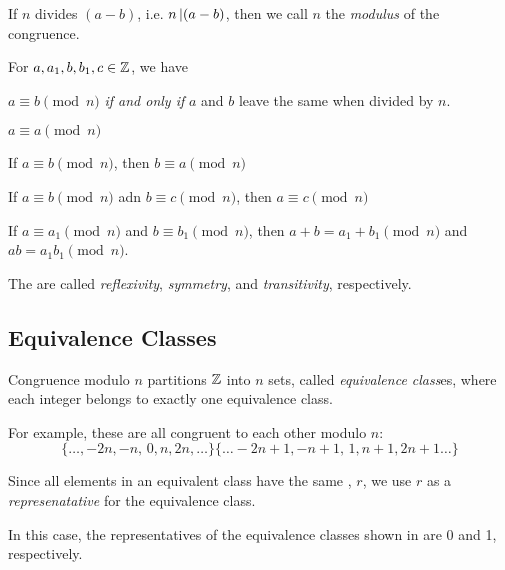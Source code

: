 If $n$ divides $(a-b)$, i.e. $n \operatorname{\vert} (a-b)$, then we call $n$ the \emph{modulus} of the congruence.

\begin{theorem}
  For $a, a_{1}, b, b_{1}, c\in \operatorname{\mathbb{Z}}$, we have
  \begin{propertylist}
  \item $a \equiv b \pmod{n}$ \emph{if and only if} $a$ and $b$ leave the same  when divided by $n$.
  \item $a \equiv a \pmod{n}$ \label{prop:A_Congruent_B_Reflexivity}
  \item If $a \equiv b \pmod{n}$, then $b \equiv a \pmod{n}$ \label{prop:A_Congruent_B_Symmetry}
  \item If $a \equiv b \pmod{n}$ adn $b \equiv c \pmod{n}$, then $a \equiv c \pmod{n}$ \label{prop:A_Congruent_B_Transitivity}
  \item If $a \equiv a_{1} \pmod{n}$ and $b \equiv b_{1} \pmod{n}$, then $a+b = a_{1} + b_{1} \pmod{n}$ and $ab = a_{1}b_{1} \pmod{n}$.
  \end{propertylist}

  The  are called \emph{reflexivity}, \emph{symmetry}, and \emph{transitivity}, respectively.
\end{theorem}

\subsection{Equivalence Classes}\label{subsec:Equivalence_Classes}
\begin{definition}\label{def:Equivalence Class}
  Congruence modulo $n$ partitions $\operatorname{\mathbb{Z}}$ into $n$ sets, called \emph{equivalence class}es, where each integer belongs to exactly one equivalence class.

  For example, these are all congruent to each other modulo $n$:
  \begin{subequations}\label{eq:Equivalence_Class}
    \begin{equation}\label{subeq:Equivalence_Class_Remainder_0}
      \lbrace \ldots, -2n, -n,\, 0, n, 2n, \ldots \rbrace
    \end{equation}
    \begin{equation}\label{subeq:Equivalence_Class_Remainder_1}
      \lbrace \ldots -2n + 1, -n+1,\, 1, n+1, 2n+1 \ldots \rbrace
    \end{equation}
  \end{subequations}

  Since all elements in an equivalent class have the same , $r$, we use $r$ as a \emph{represenatative} for the equivalence class.
  \begin{remark}
    In this case, the representatives of the equivalence classes shown in  are 0 and 1, respectively.
  \end{remark}
\end{definition}

